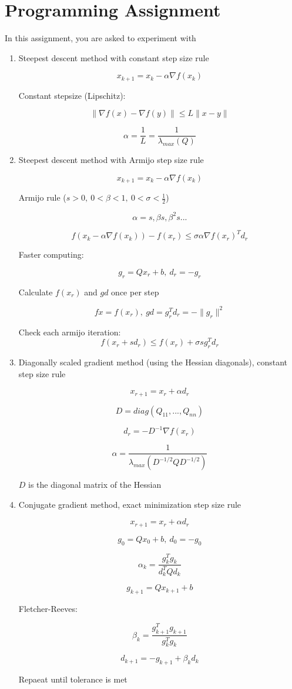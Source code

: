 \documentclass[11pt,letterpaper]{article}
\begin{document}
	\section{\bf Programming Assignment}
	In this assignment, you are asked to experiment with
	\begin{enumerate}
		\item Steepest descent method with constant step size rule 
		
		\[ x_{k+1} = x_k - \alpha \nabla f(x_k) \]   

		Constant stepsize (Lipschitz):
		
		\[ \| \nabla f(x) - \nabla f(y) \| \leq L \|x - y\| \]

		\[ \alpha = \frac{1}{L} = \frac{1}{\lambda_{max}(Q)} \]

		\item Steepest descent method with Armijo step size rule
		
		\[ x_{k+1} = x_k - \alpha \nabla f(x_k) \] 
		
		Armijo rule ($s > 0, \ 0 < \beta < 1, \ 0 < \sigma < \frac{1}{2}$)

		\[ \alpha = s, \beta s, \beta^2 s ... \]   

		\[ f(x_k - \alpha \nabla f(x_k)) - f(x_r) \leq 
		\sigma \alpha \nabla f(x_r)^T d_r\]

		Faster computing:

		\[g_r = Q x_r + b, \ d_r = -g_r \]

		Calculate $f(x_r)$ and $gd$ once per step

		\[ fx = f(x_r), \
		gd = g_r^T d_r = -\|g_r\|^2
		\]

		Check each armijo iteration:
		\[ f(x_r + sd_r) \leq 
		f(x_r) + \sigma s g_r^T d_r \]

		\item Diagonally scaled gradient method (using the Hessian diagonals), constant step size rule
		
		\[ x_{r+1} = x_r + \alpha d_r \] 

		\[ D = diag(Q_{11},..., Q_{nn}) \]

		\[ d_r = -D^{-1} \nabla f(x_r) \]
		
		\[ \alpha = \frac{1}{\lambda_{max}(D^{-1/2} Q D^{-1/2})} \]

		$D$ is the diagonal matrix of the Hessian

		\item Conjugate gradient method, exact minimization step size rule
		
		\[ x_{r+1} = x_r + \alpha d_r \] 

		\[ g_0 = Q x_0 + b, \ d_0 = -g_0 \]   

		\[ \alpha_k = \frac{g_k^T g_k}{d_k^T Q d_k} \]

		\[g_{k+1} = Q x_{k+1} + b \]

		Fletcher-Reeves:

		\[ \beta_k =
		\frac{g_{k+1}^T g_{k+1}}{g_k^T g_k} \]   

		\[d_{k+1} = -g_{k+1} + \beta_k d_k \]   

		Repaeat until tolerance is met

	\end{enumerate}
\end{document}
